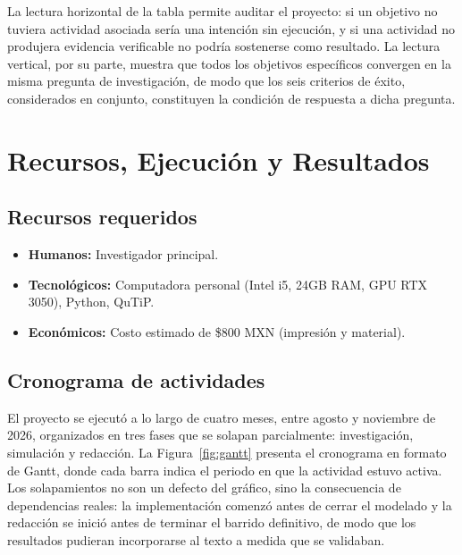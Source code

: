 \documentclass[12pt]{report}
\begin{document}
La lectura horizontal de la tabla permite auditar el proyecto: si un objetivo no
tuviera actividad asociada sería una intención sin ejecución, y si una actividad
no produjera evidencia verificable no podría sostenerse como resultado. La
lectura vertical, por su parte, muestra que todos los objetivos específicos
convergen en la misma pregunta de investigación, de modo que los seis criterios
de éxito, considerados en conjunto, constituyen la condición de respuesta a dicha
pregunta.

\chapter{Recursos, Ejecución y Resultados}

\section{Recursos requeridos}
\begin{itemize}
    \item \textbf{Humanos:} Investigador principal.
    \item \textbf{Tecnológicos:} Computadora personal (Intel i5, 24GB RAM, GPU RTX 3050), Python, QuTiP.
    \item \textbf{Económicos:} Costo estimado de \$800 MXN (impresión y material).
\end{itemize}

\section{Cronograma de actividades}

El proyecto se ejecutó a lo largo de cuatro meses, entre agosto y noviembre de
2026, organizados en tres fases que se solapan parcialmente: investigación,
simulación y redacción. La Figura~\ref{fig:gantt} presenta el cronograma en
formato de Gantt, donde cada barra indica el periodo en que la actividad estuvo
activa. Los solapamientos no son un defecto del gráfico, sino la consecuencia de
dependencias reales: la implementación comenzó antes de cerrar el modelado y la
redacción se inició antes de terminar el barrido definitivo, de modo que los
resultados pudieran incorporarse al texto a medida que se validaban.
\end{document}

